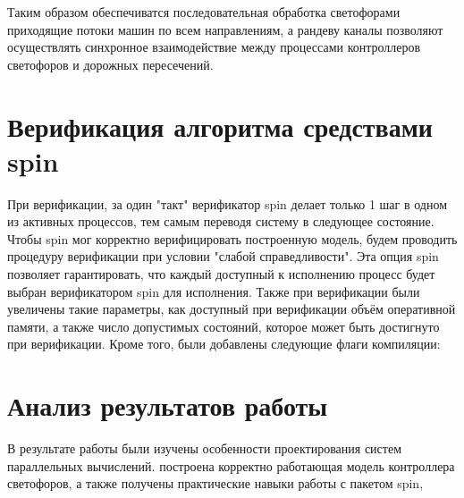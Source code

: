 \documentclass[12pt]{article}
\begin{document}


Таким образом обеспечиватся последовательная обработка светофорами приходящие потоки машин по 
всем направлениям, а рандеву каналы позволяют осуществлять синхронное взаимодействие между 
процессами контроллеров светофоров и дорожных пересечений.

\section{Верификация алгоритма средствами spin}

При верификации, за один "такт" верификатор spin делает только 1 шаг в одном из активных процессов, тем
самым переводя систему в следующее состояние. Чтобы spin мог корректно верифицировать построенную модель,
будем проводить процедуру верификации при условии "слабой справедливости". Эта опция spin
позволяет гарантировать,  что каждый доступный к исполнению процесс будет выбран верификатором spin
для исполнения. Также при верификации были увеличены такие параметры, как доступный при верификации
объём оперативной памяти, а также число допустимых состояний, которое может быть достигнуто при 
верификации. Кроме того, были добавлены следующие флаги компиляции:


\section{Анализ результатов работы}

В результате работы были изучены особенности проектирования систем параллельных вычислений. построена корректно
работающая модель контроллера светофоров, а также получены практические навыки работы с пакетом spin,
\end{document}
